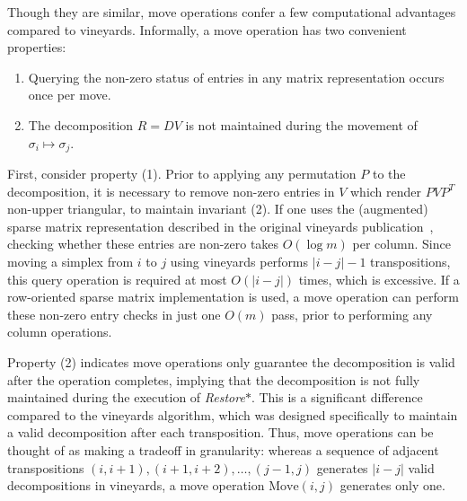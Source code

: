 \documentclass{siamart190516}
\begin{document}
Though they are similar, move operations confer a few computational advantages compared to vineyards. Informally, a move operation has two convenient properties:
\\	
 \begin{enumerate}[leftmargin=2\parindent, align=left, labelsep=-5pt, topsep=0pt,itemsep=-0.25ex,parsep=1.2ex]
 	\item Querying the non-zero status of entries in any matrix representation occurs once per move.
 	\item The decomposition $R = D V$ is not maintained during the movement of $\sigma_i \mapsto \sigma_j$.
 \end{enumerate} 
 \vspace*{1em}
First, consider property (1). Prior to applying any permutation $P$ to the decomposition, it is necessary to remove non-zero entries in $V$ which render $PVP^T$ non-upper triangular, to maintain invariant (2). 
If one uses the (augmented) sparse matrix representation described in the original vineyards publication~\cite{cohen2006vines}, checking whether these entries are non-zero takes $O(\log m)$ per column. Since moving a simplex from $i$ to $j$ using vineyards performs $\lvert i - j \rvert - 1$ transpositions, this query operation is required at most $O(\lvert i - j \rvert)$ times, which is excessive. If a row-oriented sparse matrix implementation is used, a move operation can perform these non-zero entry checks in just one $O(m)$ pass, prior to performing any column operations. 
 
Property (2) indicates move operations only guarantee the decomposition is valid after the operation completes, implying that the decomposition is not fully maintained during the execution of \textit{Restore}$\ast$. 
This is a significant difference compared to the vineyards algorithm, which was designed specifically to maintain a valid decomposition after each transposition. 
Thus, move operations can be thought of as making a tradeoff in granularity: whereas a sequence of adjacent transpositions $(i, i{+}1), (i{+}1, i{+}2), \dots, (j{-}1, j)$ generates $\lvert i - j \rvert $ valid decompositions in vineyards, a move operation $\mathrm{Move}(i,j)$ generates only one.
\end{document}
